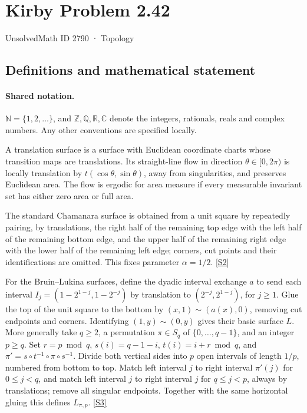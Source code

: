 \documentclass[11pt]{book}
\newcommand{\sref}[2]{\hyperlink{source:#1:#2}{[S#2]}}
\begin{document}
\setcounter{section}{2789}
\section{Kirby Problem 2.42}\label{2790}
{\small\sffamily UnsolvedMath ID 2790 · Topology}
\subsection{Definitions and mathematical statement}

\paragraph{Shared notation.}$\mathbb N=\{1,2,\ldots\}$, and $\mathbb Z,\mathbb Q,\mathbb R,\mathbb C$ denote the integers, rationals, reals and complex numbers. Any other conventions are specified locally.


A translation surface is a surface with Euclidean coordinate charts whose transition maps are translations. Its straight-line flow in direction $\theta\in[0,2\pi)$ is locally translation by $t(\cos\theta,\sin\theta)$, away from singularities, and preserves Euclidean area. The flow is ergodic for area measure if every measurable invariant set has either zero area or full area.

The standard Chamanara surface is obtained from a unit square by repeatedly pairing, by translations, the right half of the remaining top edge with the left half of the remaining bottom edge, and the upper half of the remaining right edge with the lower half of the remaining left edge; corners, cut points and their identifications are omitted. This fixes parameter $\alpha=1/2$. \sref{2790}{2}

For the Bruin--Lukina surfaces, define the dyadic interval exchange $a$ to send each interval $I_j=(1-2^{1-j},1-2^{-j})$ by translation to $(2^{-j},2^{1-j})$, for $j\geq1$. Glue the top of the unit square to the bottom by $(x,1)\sim(a(x),0)$, removing cut endpoints and corners. Identifying $(1,y)\sim(0,y)$ gives their basic surface $L$. More generally take $q\geq2$, a permutation $\pi\in S_q$ of $\{0,\ldots,q-1\}$, and an integer $p\geq q$. Set $r=p\bmod q$, $s(i)=q-1-i$, $t(i)=i+r\bmod q$, and $\pi'=s\circ t^{-1}\circ\pi\circ s^{-1}$. Divide both vertical sides into $p$ open intervals of length $1/p$, numbered from bottom to top. Match left interval $j$ to right interval $\pi'(j)$ for $0\leq j<q$, and match left interval $j$ to right interval $j$ for $q\leq j<p$, always by translations; remove all singular endpoints. Together with the same horizontal gluing this defines $L_{\pi,p}$. \sref{2790}{3}
\end{document}
